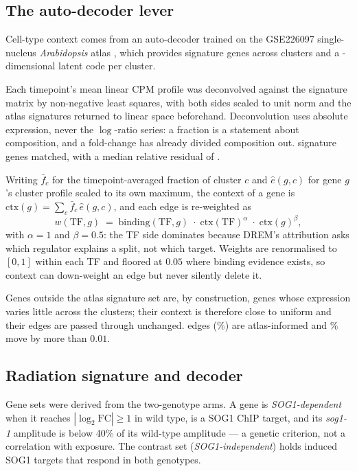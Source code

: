 \subsection{The auto-decoder lever}

Cell-type context comes from an auto-decoder trained on the GSE226097 single-nucleus
\textit{Arabidopsis} atlas \citep{lee2025atlas}, which provides
\NumAtlasSignatureGenes{} signature genes across \NumAtlasClusters{} clusters and a
\NumLatentDims{}-dimensional latent code per cluster.

Each timepoint's mean linear CPM profile was deconvolved against the signature matrix by
non-negative least squares, with both sides scaled to unit norm and the atlas signatures
returned to linear space beforehand. Deconvolution uses absolute expression, never the
$\log$-ratio series: a fraction is a statement about composition, and a fold-change has
already divided composition out. \NumDeconvGenesMatched{} signature genes matched, with a
median relative residual of \NumDeconvMedianResidual{}.

Writing $\bar f_c$ for the timepoint-averaged fraction of cluster $c$ and $\hat e(g,c)$
for gene $g$'s cluster profile scaled to its own maximum, the context of a gene is
$\mathrm{ctx}(g) = \sum_c \bar f_c\, \hat e(g,c)$, and each edge is re-weighted as
\[
  w(\mathrm{TF}, g) \;=\; \mathrm{binding}(\mathrm{TF}, g)\;
  \cdot\; \mathrm{ctx}(\mathrm{TF})^{\alpha}\;\cdot\;\mathrm{ctx}(g)^{\beta},
\]
with $\alpha = 1$ and $\beta = 0.5$: the TF side dominates because DREM's attribution
asks which regulator explains a split, not which target. Weights are renormalised to
$[0,1]$ within each TF and floored at $0.05$ where binding evidence exists, so context can
down-weight an edge but never silently delete it.

Genes outside the atlas signature set are, by construction, genes whose expression varies
little across the \NumAtlasClusters{} clusters; their context is therefore close to
uniform and their edges are passed through unchanged. \NumWeightedEdgesInformed{} edges
(\PctWeightedEdgesInformed{}\%) are atlas-informed and
\PctWeightedEdgesChanged{}\% move by more than $0.01$.

\subsection{Radiation signature and decoder}

Gene sets were derived from the two-genotype arms. A gene is \emph{SOG1-dependent} when it
reaches $|\log_2 \mathrm{FC}| \ge 1$ in wild type, is a SOG1 ChIP target, and its
\textit{sog1-1} amplitude is below 40\% of its wild-type amplitude --- a genetic criterion,
not a correlation with exposure. The contrast set (\emph{SOG1-independent}) holds induced
SOG1 targets that respond in both genotypes.

